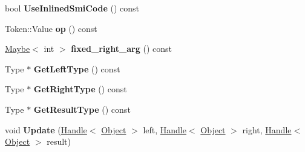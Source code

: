 \begin{DoxyCompactItemize}
\item 
bool {\bfseries Use\+Inlined\+Smi\+Code} () const \hypertarget{classv8_1_1internal_1_1_b_a_s_e___e_m_b_e_d_d_e_d_a3bb23265085aa0c963bf74ef3428620d}{}\label{classv8_1_1internal_1_1_b_a_s_e___e_m_b_e_d_d_e_d_a3bb23265085aa0c963bf74ef3428620d}

\item 
Token\+::\+Value {\bfseries op} () const \hypertarget{classv8_1_1internal_1_1_b_a_s_e___e_m_b_e_d_d_e_d_aa1fd8f6a032b4d4989b4e1dc98f18edd}{}\label{classv8_1_1internal_1_1_b_a_s_e___e_m_b_e_d_d_e_d_aa1fd8f6a032b4d4989b4e1dc98f18edd}

\item 
\hyperlink{classv8_1_1_maybe}{Maybe}$<$ int $>$ {\bfseries fixed\+\_\+right\+\_\+arg} () const \hypertarget{classv8_1_1internal_1_1_b_a_s_e___e_m_b_e_d_d_e_d_a199133899e6b102aaacc5283f3db68b9}{}\label{classv8_1_1internal_1_1_b_a_s_e___e_m_b_e_d_d_e_d_a199133899e6b102aaacc5283f3db68b9}

\item 
Type $\ast$ {\bfseries Get\+Left\+Type} () const \hypertarget{classv8_1_1internal_1_1_b_a_s_e___e_m_b_e_d_d_e_d_ae5572b2ab1dd21eb9ea4e489eeb5fa5a}{}\label{classv8_1_1internal_1_1_b_a_s_e___e_m_b_e_d_d_e_d_ae5572b2ab1dd21eb9ea4e489eeb5fa5a}

\item 
Type $\ast$ {\bfseries Get\+Right\+Type} () const \hypertarget{classv8_1_1internal_1_1_b_a_s_e___e_m_b_e_d_d_e_d_a7963e3dc1c962b36dd05e62f31c14e86}{}\label{classv8_1_1internal_1_1_b_a_s_e___e_m_b_e_d_d_e_d_a7963e3dc1c962b36dd05e62f31c14e86}

\item 
Type $\ast$ {\bfseries Get\+Result\+Type} () const \hypertarget{classv8_1_1internal_1_1_b_a_s_e___e_m_b_e_d_d_e_d_abd3fe50f0c0b3021b1851b61052e6b34}{}\label{classv8_1_1internal_1_1_b_a_s_e___e_m_b_e_d_d_e_d_abd3fe50f0c0b3021b1851b61052e6b34}

\item 
void {\bfseries Update} (\hyperlink{classv8_1_1internal_1_1_handle}{Handle}$<$ \hyperlink{classv8_1_1internal_1_1_object}{Object} $>$ left, \hyperlink{classv8_1_1internal_1_1_handle}{Handle}$<$ \hyperlink{classv8_1_1internal_1_1_object}{Object} $>$ right, \hyperlink{classv8_1_1internal_1_1_handle}{Handle}$<$ \hyperlink{classv8_1_1internal_1_1_object}{Object} $>$ result)\hypertarget{classv8_1_1internal_1_1_b_a_s_e___e_m_b_e_d_d_e_d_af84756c3f25978a5551fec06fe707db4}{}\label{classv8_1_1internal_1_1_b_a_s_e___e_m_b_e_d_d_e_d_af84756c3f25978a5551fec06fe707db4}


\end{DoxyCompactItemize}
